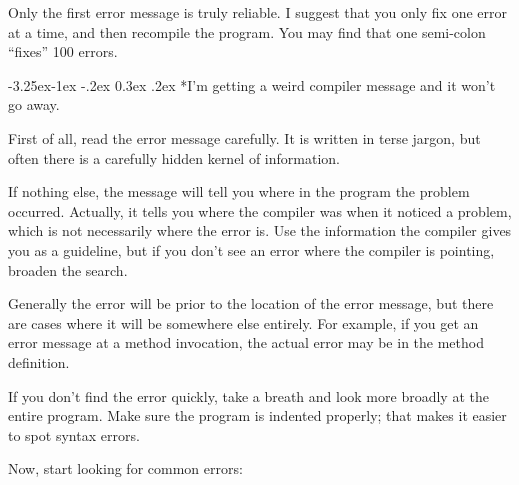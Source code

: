 \documentclass[12pt]{book}
\makeatletter
\theoremstyle{exercise}
\renewcommand\subsection{\@startsection{subsection}{2}{\z@}%
    {-3.25ex\@plus -1ex \@minus -.2ex}%
    {0.3ex \@plus .2ex}%
    {\normalfont\large\bfseries}}
\makeatother
\begin{document}
Only the first error message is truly reliable.
I suggest that you only fix one error at a time, and then recompile the
program.
You may find that one semi-colon ``fixes'' 100 errors.


\subsection*{I'm getting a weird compiler message and it
won't go away.}

First of all, read the error message carefully.
It is written in terse jargon, but often there is a carefully hidden kernel of
information.

If nothing else, the message will tell you where in the program the problem occurred.
Actually, it tells you where the compiler was when it noticed a problem, which is not necessarily where the error is.
Use the information the compiler gives you as a guideline, but if you don't see an error where the compiler is pointing, broaden the search.

Generally the error will be prior to the location of the error message, but there are cases where it will be somewhere else entirely.
For example, if you get an error message at a method invocation, the actual error may be in the method definition.

If you don't find the error quickly, take a breath and look more broadly at the entire program.
Make sure the program is indented properly; that makes it easier to spot syntax errors.

Now, start looking for common errors:
\end{document}
